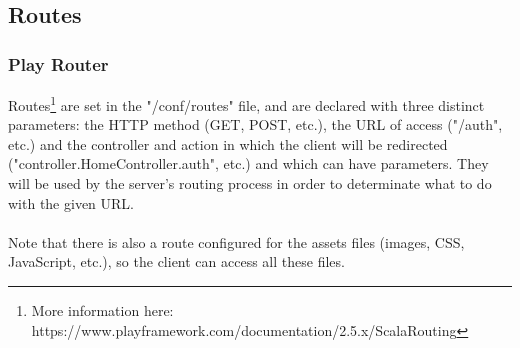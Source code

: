 \documentclass[a4paper,11pt]{report}
\begin{document}
\subsection{Routes}
\subsubsection{Play Router}
Routes\footnote{More information here: https://www.playframework.com/documentation/2.5.x/ScalaRouting} are set in the "/conf/routes" file, and are declared with three distinct parameters: the HTTP method (GET, POST, etc.), the URL of access ("/auth", etc.) and the controller and action in which the client will be redirected ("controller.HomeController.auth", etc.) and which can have parameters. They will be used by the server's routing process in order to determinate what to do with the given URL.\\\\
Note that there is also a route configured for the assets files (images, CSS, JavaScript, etc.), so the client can access all these files.
\bigskip
\end{document}
